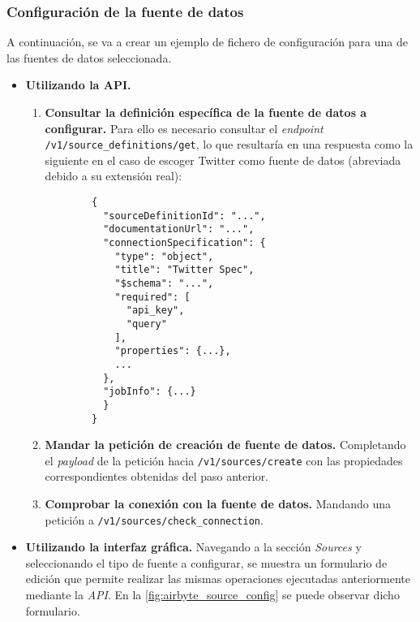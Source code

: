 \subsubsection{Configuración de la fuente de datos}

A continuación, se va a crear un ejemplo de fichero de configuración para una de las fuentes de datos seleccionada.

\begin{itemize}
    
    \item \textbf{Utilizando la API.}
    
    \begin{enumerate}
        
        \item \textbf{Consultar la definición específica de la fuente de datos a configurar.} Para ello es necesario consultar el \textit{endpoint} \verb|/v1/source_definitions/get|, lo que resultaría en una respuesta como la siguiente en el caso de escoger Twitter como fuente de datos (abreviada debido a su extensión real):

        \begin{verbatim}
        {
          "sourceDefinitionId": "...",
          "documentationUrl": "...",
          "connectionSpecification": {
            "type": "object",
            "title": "Twitter Spec",
            "$schema": "...",
            "required": [
              "api_key",
              "query"
            ],
            "properties": {...},
            ...
          },
          "jobInfo": {...}
          }
        }
        \end{verbatim}
        
        \item \textbf{Mandar la petición de creación de fuente de datos.} Completando el \textit{payload} de la petición hacia \verb|/v1/sources/create| con las propiedades correspondientes obtenidas del paso anterior. 
        
        \item \textbf{Comprobar la conexión con la fuente de datos.} Mandando una petición a \verb|/v1/sources/check_connection|.
    
    \end{enumerate}
    
    \item \textbf{Utilizando la interfaz gráfica.} Navegando a la sección \textit{Sources} y seleccionando el tipo de fuente a configurar, se muestra un formulario de edición que permite realizar las mismas operaciones ejecutadas anteriormente mediante la \textit{API}. En la \autoref{fig:airbyte_source_config} se puede observar dicho formulario.

    
\end{itemize}

